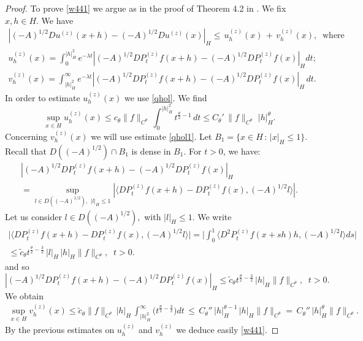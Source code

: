\documentclass[preprint]{imsart}
\begin{document}
\begin{proof}
To prove  \eqref{w441} we argue as in  the proof of Theorem 4.2 in \cite{PriolaStudia}.   We fix $x, h \in H$.
 We have
\begin{gather*}
|  (-A)^{1/2} Du^{(z)}(x + h) -  (-A)^{1/2} D u^{(z)} (x)|_H  \le
 \,  u_h^{(z)} (x) \, +  \, v_h^{(z)}(x), \;\; \text{where} 
 \\
u_h^{(z)}(x) = \int_0^{|h|^{2}_H}  e^{- \lambda t } |(-A)^{1/2} 
 D P_t^{(z)} f (x+ h) -  (-A)^{1/2}  D P_t^{(z)} f (x)|_H dt; 
 \\  v_h^{(z)}(x) =
\int_{|h|^{2}_H}^{\infty} e^{- \lambda t } |  (-A)^{1/2}  D
P_t^{(z)} f (x+  h) -  (-A)^{1/2}  D  P_t^{(z)} f (x)|_H \, dt.
\end{gather*} 
In order to estimate $u_h^{(z)}(x)$ we use  \eqref{qhol}. 
    We find  
$$
\sup_{x \in H} u_h^{(z)}(x) \le c_{\theta}  \| f\|_{C^\theta} \,
\int_0^{|h|^{2}_H} t^{\frac{\theta}{2} - 1} \, dt 
\le
C_{\theta}' \,  \| f\|_{C^{\theta}} \, \, |h|^{ \theta}_H.
$$ 
 Concerning $v_h^{(z)}(x)$ we will use estimate   \eqref{qhol1}.   Let $B_1 = \{ x \in H \, :\, |x|_H \le 1 \}$. Recall that $D((-A)^{1/2}) \cap B_1  
 $ is dense in $B_1$. 
  For $t>0$, we have:
 \begin{gather*}
|  (-A)^{1/2}  D
P_t^{(z)} f (x+  h) -  (-A)^{1/2}  D  P_t^{(z)} f (x)|_H 
\\
= \sup_{l \in D((-A)^{1/2} ), \, \,  |l|_H \le 1}
 | \langle  D
P_t^{(z)} f (x+  h) -     D  P_t^{(z)} f (x), (-A)^{1/2} l \rangle|.
\end{gather*}
 Let us consider $l \in D((-A)^{1/2} ),$ with $ |l|_H \le 1$. We write  
\begin{gather*} 
\big | \langle  D
P_t^{(z)} f (x+  h) -     D  P_t^{(z)} f (x), (-A)^{1/2} l \rangle \big |
= 
\Big |   \int_0^1 \langle D^2
P_t^{(z)} f (x+ s h) h  , (-A)^{1/2} l \rangle ds \Big |
\\
\le {\tilde c_{\theta}} t^{ \frac{\theta}{2} - \frac{3}{2}} \, |  l|_H \,  |  h|_H \|f\|_{C^{\theta}},\;\; t>0.     
\end{gather*}  
 and so  $ |  (-A)^{1/2}  D
P_t^{(z)} f (x+  h) -  (-A)^{1/2}  D  P_t^{(z)} f (x)|_H  \le {\tilde c_{\theta}}{t^{      \frac{\theta}{2}- \frac{3}{2} }}  \,   |  h|_H \|f\|_{C^{\theta}},\;\; t>0.  $ 
  We obtain 
  \begin{gather*} 
\sup_{x \in H}
 v_h^{(z)}(x) \le  \tilde c_{\theta}  \| f\|_{C^{\theta}} \, |h|_H \,
\int_{|h|^{2}_H} ^{\infty}  \big (
 t^{\frac{\theta}{2} - \frac{3}{2}  }    \big ) dt \,
  \le   \, C_{\theta}'' \,  |h|^{\theta -1}_H \, |h|_H 
  \| f\|_{C^{\theta}} = \, C_{\theta}'' \,  |h|^{\theta}_H 
  \| f\|_{C^{\theta}}.
\end{gather*}  
 By the previous  estimates on  $u_h^{(z)}$ and $v_h^{(z)}$ we deduce easily  \eqref{w441}.
 

\end{proof}
\end{document}
